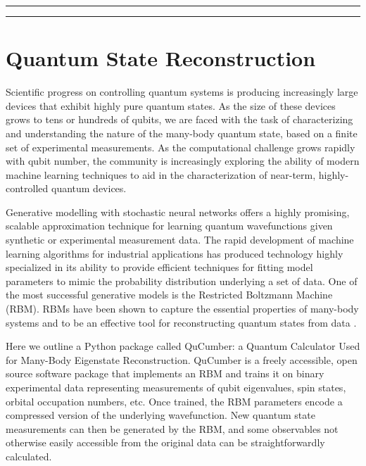\documentclass[submission, Phys]{SciPost}
\begin{document}
\vspace{10pt}
\noindent\rule{\textwidth}{1pt}
\tableofcontents\thispagestyle{fancy}
\noindent\rule{\textwidth}{1pt}
\vspace{10pt}


\section{Quantum State Reconstruction}

Scientific progress on controlling quantum systems is producing increasingly large devices that exhibit highly pure quantum states.  As the size of these devices grows to tens or hundreds of qubits, we are faced with the task of characterizing and understanding the nature of the many-body quantum state, based on a finite set of experimental measurements.  As the computational challenge grows rapidly with qubit number, the community is increasingly exploring the ability of modern machine learning techniques to aid in the characterization of near-term, highly-controlled quantum devices.

Generative modelling with stochastic neural networks offers a highly promising, scalable approximation technique for learning quantum wavefunctions given synthetic or experimental measurement data.  The rapid development of machine learning algorithms for industrial applications has produced technology highly specialized in its ability to provide efficient techniques for fitting model parameters to mimic the probability distribution underlying a set of data.  One of the most successful generative models is the Restricted Boltzmann Machine (RBM).  RBMs have been shown to capture the essential properties of many-body systems and to be an effective tool for reconstructing quantum states from data \cite{Torlai2016thermo, torlai2018tomography, CarleoTroyer2017Science}.

Here we outline a Python package called QuCumber: a Quantum Calculator Used for Many-Body Eigenstate Reconstruction.  QuCumber is a freely accessible, open source software package that implements an RBM and trains it on binary experimental data representing measurements of qubit eigenvalues, spin states, orbital occupation numbers, etc.  Once trained, the RBM parameters encode a compressed version of the underlying wavefunction.  New quantum state measurements can then be generated by the RBM, and some observables not otherwise easily accessible from the original data can be straightforwardly calculated.
\end{document}
